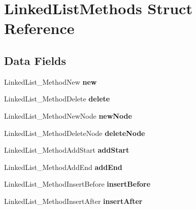 \hypertarget{structLinkedListMethods}{\section{Linked\-List\-Methods Struct Reference}
\label{structLinkedListMethods}
}
\subsection*{Data Fields}
\begin{DoxyCompactItemize}
\item 
\hypertarget{structLinkedListMethods_ad5aa177dc7d518b143c97d5c325564dd}{Linked\-List\-\_\-\-Method\-New {\bfseries new}}\label{structLinkedListMethods_ad5aa177dc7d518b143c97d5c325564dd}

\item 
\hypertarget{structLinkedListMethods_ae5a274043f0114bc6a1f0a385aa3bf8a}{Linked\-List\-\_\-\-Method\-Delete {\bfseries delete}}\label{structLinkedListMethods_ae5a274043f0114bc6a1f0a385aa3bf8a}

\item 
\hypertarget{structLinkedListMethods_a63984d672fb9f8af6ea08cf03a5f8f98}{Linked\-List\-\_\-\-Method\-New\-Node {\bfseries new\-Node}}\label{structLinkedListMethods_a63984d672fb9f8af6ea08cf03a5f8f98}

\item 
\hypertarget{structLinkedListMethods_af69a94f9490794098828b5be146fd199}{Linked\-List\-\_\-\-Method\-Delete\-Node {\bfseries delete\-Node}}\label{structLinkedListMethods_af69a94f9490794098828b5be146fd199}

\item 
\hypertarget{structLinkedListMethods_ac21507282a737c100f76f5459ee4afbb}{Linked\-List\-\_\-\-Method\-Add\-Start {\bfseries add\-Start}}\label{structLinkedListMethods_ac21507282a737c100f76f5459ee4afbb}

\item 
\hypertarget{structLinkedListMethods_a38de04d3df65efb00926b3ca9ba73b99}{Linked\-List\-\_\-\-Method\-Add\-End {\bfseries add\-End}}\label{structLinkedListMethods_a38de04d3df65efb00926b3ca9ba73b99}

\item 
\hypertarget{structLinkedListMethods_a9c50113ff7bd1b39df51b2fd339e7e92}{Linked\-List\-\_\-\-Method\-Insert\-Before {\bfseries insert\-Before}}\label{structLinkedListMethods_a9c50113ff7bd1b39df51b2fd339e7e92}

\item 
\hypertarget{structLinkedListMethods_a1db92b51901a865b0421a2cdb5d28c6d}{Linked\-List\-\_\-\-Method\-Insert\-After {\bfseries insert\-After}}\label{structLinkedListMethods_a1db92b51901a865b0421a2cdb5d28c6d}


\end{DoxyCompactItemize}
